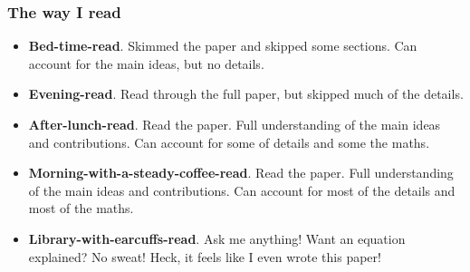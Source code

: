 \documentclass[10pt]{beamer}
\begin{document}
\begin{frame}
\frametitle{The way I read}

\begin{itemize}
\item \textbf{Bed-time-read}. Skimmed the paper and skipped some sections. Can
  account for the main ideas, but no details.

\item \textbf{Evening-read}. Read through the full paper, but skipped much of
  the details.

\item \textbf{After-lunch-read}. Read the paper. Full understanding of the main ideas and contributions. Can account for some of details and some the maths.

\item \textbf{Morning-with-a-steady-coffee-read}. Read the paper. Full
  understanding of the main ideas and contributions. Can account for most of
  the details and most of the maths.

\item \textbf{Library-with-earcuffs-read}. Ask me anything! Want an equation explained? No sweat! Heck, it feels like I even wrote this paper!

\end{itemize}

\end{frame}



\end{document}
